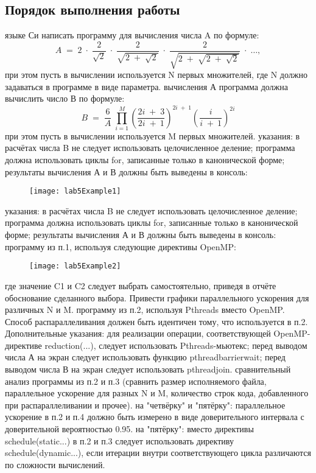{ %
	\subsection{Порядок выполнения работы}
	\Large
	\begin{enumerate}
		 языке Си написать программу для вычисления числа A по формуле:
			$$A\;=\;2\;\cdot\;\frac2{\sqrt2}\;\cdot\;\frac2{\sqrt{2\;+\;\sqrt2}}\;\cdot\;\frac2{\sqrt{2\;+\;\sqrt{2\;+\;\sqrt2}}}\;\cdot\;\dots,$$
			 при этом пусть в вычислении используется N первых множителей, где N должно задаваться в программе в виде параметра.
		 вычисления А программа должна вычислить число В по формуле: 
			$$B\;=\;\frac6A\;{\textstyle\prod_ {i=1}^M}\left(\frac{2i\;+\;3}{2i\;+\:1}\right)^{2i\;+\;1}\left(\frac i{i\;+\:1}\right)^{2i}$$
			при этом пусть в вычислении используется M первых множителей.
			 указания: в расчётах числа B не следует использовать целочисленное деление; программа должна использовать циклы for, записанные только в канонической форме; результаты вычисления А и В должны быть выведены в консоль:
			\begin{figure}[H]
				\texttt{[image: lab5Example1]}
			\end{figure}
			 указания: в расчётах числа B не следует использовать целочисленное деление; программа должна использовать циклы for, записанные только в канонической форме; результаты вычисления А и В должны быть выведены в консоль:
		 программу из п.1, используя следующие директивы OpenMP:
			\begin{figure}[H]
				\texttt{[image: lab5Example2]}
			\end{figure}
			где значение C1 и C2 следует выбрать самостоятельно, приведя в отчёте обоснование сделанного выбора. Привести графики параллельного ускорения для различных N и M.
		 программу из п.2, используя Pthreads вместо OpenMP. Способ распараллеливания должен быть идентичен тому, что используется  в п.2. Дополнительные указания: для реализации операции, соответствующей OpenMP-директиве reduction(...), следует использовать Pthreads-мьютекс; перед выводом числа А на экран следует использовать функцию pthread\textunderscore barrier\textunderscore wait; перед выводом числа В на экран следует использовать pthread\textunderscore join.
		 сравнительный анализ программы из п.2 и п.3 (сравнить размер исполняемого файла, параллельное ускорение для разных N и M, количество строк кода, добавленного при распараллеливании и прочее).
		 на "четвёрку" и "пятёрку": параллельное ускорение в п.2 и п.4  должно быть измерено в виде доверительного интервала с доверительной вероятностью 0.95.
		 на "пятёрку": вместо директивы schedule(static...) в п.2 и п.3 следует использовать директиву schedule(dynamic...), если итерации внутри соответствующего цикла различаются по сложности вычислений.
	\end{enumerate}
}
